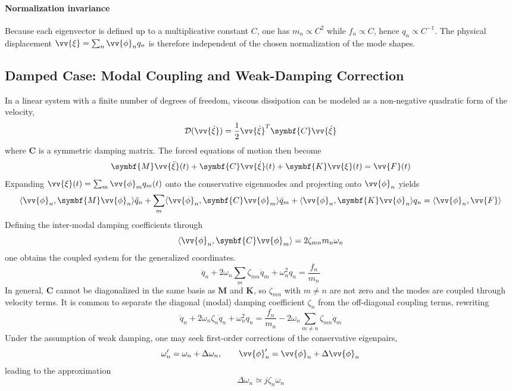 \paragraph{Normalization invariance} Because each eigenvector is defined up to a multiplicative constant \( C \), one has \( m_n \propto C^2 \) while \( f_n \propto C \), hence \( q_n \propto C^{ - 1} \). The physical displacement \( \vv{\xi} = \sum_n \vv{\phi}_n q_n \) is therefore independent of the chosen normalization of the mode shapes. 

\subsection{Damped Case: Modal Coupling and Weak-Damping Correction}

In a linear system with a finite number of degrees of freedom, viscous dissipation can be modeled as a non-negative quadratic form of the velocity,
\[
\mathcal{D}(\vv{\dot{\xi}}) = \frac{1}{2}\vv{\dot{\xi}}^{T}\symbf{C}\vv{\dot{\xi}}
\]
where \( \symbf{C} \) is a symmetric damping matrix. The forced equations of motion then become
\[
\symbf{M}\vv{\ddot{\xi}}(t) + \symbf{C}\vv{\dot{\xi}}(t) + \symbf{K}\vv{\xi}(t) = \vv{F}(t)
\]
Expanding \( \vv{\xi}(t) = \sum_m \vv{\phi}_m q_m(t) \) onto the conservative eigenmodes and projecting onto \( \vv{\phi}_n \) yields
\[
\langle \vv{\phi}_n,\symbf{M}\vv{\phi}_n\rangle \ddot{q}_n
 + \sum_{m}\langle \vv{\phi}_n,\symbf{C}\vv{\phi}_m\rangle \dot{q}_m
 + \langle \vv{\phi}_n,\symbf{K}\vv{\phi}_n\rangle q_n
 = \langle \vv{\phi}_n,\vv{F}\rangle
\]
Defining the inter-modal damping coefficients through
\[
\langle \vv{\phi}_n,\symbf{C}\vv{\phi}_m\rangle = 2\zeta_{mn}m_n\omega_n
\]
one obtains the coupled system for the generalized coordinates.
\[
\ddot{q}_n + 2\omega_n\sum_{m}\zeta_{mn}\dot{q}_m + \omega_n^2 q_n
 = \frac{f_n}{m_n}
\]
In general, \( \symbf{C} \) cannot be diagonalized in the same basis as \( \symbf{M} \) and \( \symbf{K} \), so \( \zeta_{mn} \) with \( m \neq n \) are not zero and the modes are coupled through velocity terms. It is common to separate the diagonal (modal) damping coefficient \( \zeta_n \) from the off-diagonal coupling terms, rewriting
\[
\ddot{q}_n + 2\omega_n\zeta_n\dot{q}_n + \omega_n^2 q_n
 = \frac{f_n}{m_n} - 2\omega_n\sum_{m\neq n}\zeta_{mn}\dot{q}_m
\]
Under the assumption of weak damping, one may seek first-order corrections of the conservative eigenpairs,
\[
\omega_n' = \omega_n + \Delta\omega_n,
\qquad
\vv{\phi}_n' = \vv{\phi}_n + \Delta\vv{\phi}_n
\]
leading to the approximation
\[
\Delta\omega_n \simeq j\zeta_n\omega_n
\]
